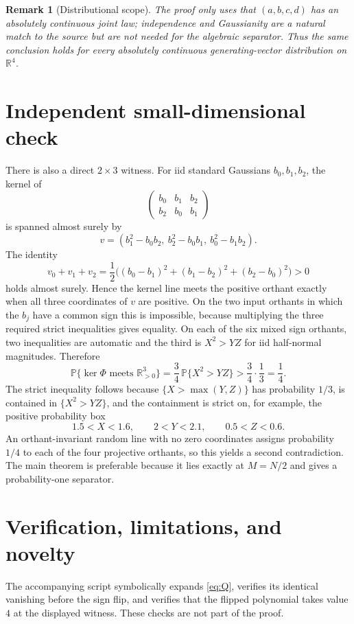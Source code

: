 \documentclass[11pt]{article}
\newtheorem{remark}[theorem]{Remark}
\newcommand{\R}{\mathbb R}
\begin{document}
\begin{remark}[Distributional scope]\label{rem:scope}
The proof only uses that $(a,b,c,d)$ has an absolutely continuous joint law;
independence and Gaussianity are a natural match to the source but are not
needed for the algebraic separator.  Thus the same conclusion holds for every
absolutely continuous generating-vector distribution on $\R^4$.
\end{remark}

\section{Independent small-dimensional check}

There is also a direct $2\times3$ witness.  For iid standard Gaussians
$b_0,b_1,b_2$, the kernel of
\[
 \begin{pmatrix}b_0&b_1&b_2\\b_2&b_0&b_1\end{pmatrix}
\]
is spanned almost surely by
\[
 v=(b_1^2-b_0b_2,\ b_2^2-b_0b_1,\ b_0^2-b_1b_2).
\]
The identity
\[
 v_0+v_1+v_2=\frac12\bigl((b_0-b_1)^2+(b_1-b_2)^2+(b_2-b_0)^2\bigr)>0
\]
holds almost surely.  Hence the kernel line meets the positive orthant exactly
when all three coordinates of $v$ are positive.  On the two input orthants in
which the $b_j$ have a common sign this is impossible, because multiplying the
three required strict inequalities gives equality.  On each of the six mixed
sign orthants, two inequalities are automatic and the third is $X^2>YZ$ for
iid half-normal magnitudes.  Therefore
\[
 \mathbb P\{\ker\Phi\text{ meets }\R_{>0}^3\}
 =\frac34\,\mathbb P\{X^2>YZ\}>\frac34\cdot\frac13=\frac14.
\]
The strict inequality follows because
$\{X>\max(Y,Z)\}$ has probability $1/3$, is contained in
$\{X^2>YZ\}$, and the containment is strict on, for example, the positive
probability box
\[
 1.5<X<1.6,\qquad 2<Y<2.1,\qquad 0.5<Z<0.6.
\]
An orthant-invariant random line with no zero coordinates assigns probability
$1/4$ to each of the four projective orthants, so this yields a second
contradiction.  The main theorem is preferable because it lies exactly at
$M=N/2$ and gives a probability-one separator.

\section{Verification, limitations, and novelty}

The accompanying script symbolically expands \eqref{eq:Q}, verifies its
identical vanishing before the sign flip, and verifies that the flipped
polynomial takes value $4$ at the displayed witness.  These checks are not
part of the proof.
\end{document}
